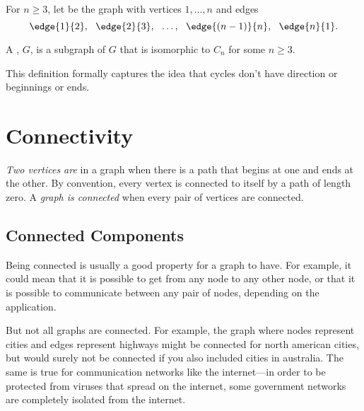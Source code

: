 \begin{definition}
  For $n \ge 3$, let  be the graph with vertices $1,\dots, n$
  and edges
\[
\edge{1}{2},\ \ \edge{2}{3},\ \ \dots,\ \ \edge{(n-1)}{n},\ \ \edge{n}{1}.
\]

\iffalse
A graph is a \term{cycle} of length $n$ iff it is isomorphic to $C_n$
for some $n \ge 3$.
\fi

A , $G$, is a subgraph of $G$ that is
isomorphic to $C_n$ for some $n \ge 3$.
\end{definition}

This definition formally captures the idea that cycles don't
have direction or beginnings or ends.

\begin{problems}
\homeworkproblems
{}
\end{problems}


\section{Connectivity}\label{connect-sec}

\begin{definition}\label{def:connected-vertices} %
  \emph{Two vertices are}  in a graph when there is a
  path that begins at one and ends at the other.  By convention, every
  vertex is connected to itself by a path of length zero.  A
  \emph{graph is connected} when every pair of vertices are connected.
\end{definition}


\subsection{Connected Components}

Being connected is usually a good property for a graph to have.  For
example, it could mean that it is possible to get from any node to any
other node, or that it is possible to communicate between any pair of
nodes, depending on the application.

But not all graphs are connected.  For example, the graph where nodes
represent cities and edges represent highways might be connected for
north american cities, but would surely not be connected if you also
included cities in australia.  The same is true for communication
networks like the internet---in order to be protected from viruses
that spread on the internet, some government networks are completely
isolated from the internet.

